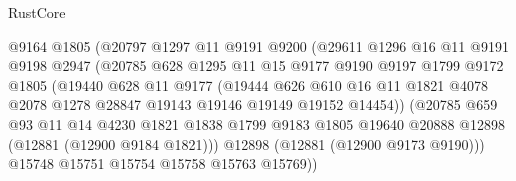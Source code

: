 \begin{lexlean}{RustCore}
\begin{coremodule}
                          @9164
                          @1805
                          (@20797
                            @1297
                            @11
                            @9191
                            @9200
                            (@29611
                              @1296
                              @16
                              @11
                              @9191
                              @9198
                              @2947
                              (@20785
                                @628
                                @1295
                                @11
                                @15
                                @9177
                                @9190
                                @9197
                                @1799
                                @9172
                                @1805
                                (@19440
                                  @628
                                  @11
                                  @9177
                                  (@19444
                                    @626
                                    @610
                                    @16
                                    @11
                                    @1821
                                    @4078
                                    @2078
                                    @1278
                                    @28847
                                    @19143
                                    @19146
                                    @19149
                                    @19152
                                    @14454))
                                (@20785
                                  @659
                                  @93
                                  @11
                                  @14
                                  @4230
                                  @1821
                                  @1838
                                  @1799
                                  @9183
                                  @1805
                                  @19640
                                  @20888
                                  @12898
                                  (@12881 (@12900 @9184 @1821)))
                                @12898
                                (@12881 (@12900 @9173 @9190)))
                              @15748
                              @15751
                              @15754
                              @15758
                              @15763
                              @15769))

\end{coremodule}
\end{lexlean}

